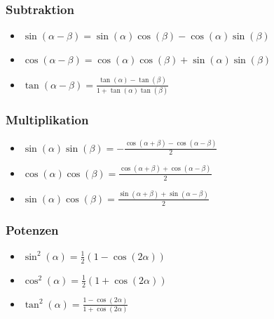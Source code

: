 \documentclass[a4paper,10pt]{article}
\begin{document}
				\subsubsection{Subtraktion}
				\begin{itemize}
					\item $\sin(\alpha - \beta) = \sin(\alpha) \cos(\beta) - \cos(\alpha)\sin(\beta)$
					\item $\cos(\alpha - \beta) = \cos(\alpha) \cos(\beta) + \sin(\alpha)\sin(\beta)$
					\item $\tan(\alpha - \beta) = \frac{\tan(\alpha) - \tan(\beta)}{1+\tan(\alpha) \tan(\beta)}$
				\end{itemize}
				
				\subsubsection{Multiplikation}
				\begin{itemize}
					\item $\sin(\alpha) \sin(\beta) = -\frac{\cos(\alpha + \beta) - \cos(\alpha - \beta)}{2}$
					\item $\cos(\alpha) \cos(\beta) =  \frac{\cos(\alpha + \beta) + \cos(\alpha - \beta)}{2}$
					\item $\sin(\alpha) \cos(\beta) =  \frac{\sin(\alpha + \beta) + \sin(\alpha - \beta)}{2}$
				\end{itemize}
				
				\subsubsection{Potenzen}
				\begin{itemize}
					\item $\sin^2(\alpha) = \frac{1}{2}(1-\cos(2\alpha))$
					\item $\cos^2(\alpha) = \frac{1}{2}(1+\cos(2\alpha))$
					\item $\tan^2(\alpha) = \frac{1-\cos(2\alpha)}{1+\cos(2\alpha)}$
				\end{itemize}
				
				
				
\end{document}

